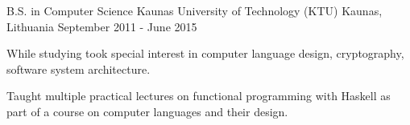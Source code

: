 

\begin{cventries}

  \cventry
    {B.S. in Computer Science} %
    {Kaunas University of Technology (KTU)} %
    {Kaunas, Lithuania} %
    {September 2011 - June 2015} %
    {
      \begin{cvitems} %
        \item {While studying took special interest in computer language design, cryptography, software system architecture.}
        \item {Taught multiple practical lectures on functional programming with Haskell as part of a course on computer languages and their design.}
      \end{cvitems}
    }

\end{cventries}

